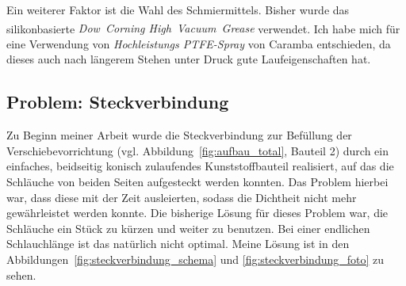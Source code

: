 \documentclass[
    11pt,
    ngerman
]{scrbook}
\begin{document}
Ein weiterer Faktor ist die Wahl des Schmiermittels. Bisher wurde das
silikonbasierte \linebreak \emph{Dow~Corning\textsuperscript{\textregistered}
High~Vacuum~Grease} verwendet. Ich habe mich für eine Verwendung von \linebreak
\emph{Hochleistungs PTFE-Spray} von Caramba entschieden, da dieses
auch nach längerem Stehen unter Druck gute Laufeigenschaften hat.


\subsection{Problem: Steckverbindung}

Zu Beginn meiner Arbeit wurde die Steckverbindung zur Befüllung der
Verschiebevorrichtung (vgl. Abbildung~\ref{fig:aufbau_total}, Bauteil 2) durch
ein einfaches, beidseitig konisch zulaufendes Kunststoffbauteil realisiert, auf
das die Schläuche von beiden Seiten aufgesteckt werden konnten. Das Problem
hierbei war, dass diese mit der Zeit ausleierten, sodass die Dichtheit nicht
mehr gewährleistet werden konnte. Die bisherige Lösung für dieses Problem war,
die Schläuche ein Stück zu kürzen und weiter zu benutzen. Bei einer endlichen
Schlauchlänge ist das natürlich nicht optimal. Meine Lösung ist in den
Abbildungen~\ref{fig:steckverbindung_schema} und
\ref{fig:steckverbindung_foto} zu sehen.
\end{document}
